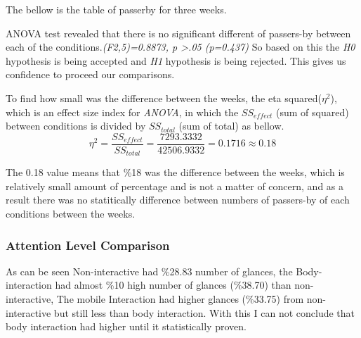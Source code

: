 The bellow is the table of passerby for three weeks.

\begin{table}[H]
\caption{Number of passerby in three weeks}
\label{tab:passerbyofthreeweeks}
\centering
{}
\end{table}

ANOVA test revealed that there is no significant different of passers-by between each of the conditions.\emph{(F2,5)=0.8873, p >.05 (p=0.437)}
So based on this the \emph{H0} hypothesis is being accepted and \emph{H1} hypothesis is being rejected. This gives us confidence to proceed our comparisons.

To find how small was the difference between the weeks, the eta squared(${\eta}^2$), which is an effect size index for \emph{ANOVA}, in which the $SS_{effect}$ (sum of squared) between conditions is divided by $SS_{total}$  (sum of total) as bellow.
\[
{\eta}^2 = \frac{{SS}_{effect}}{{SS}_{total}} = \frac{7293.3332}{42506.9332} = 0.1716\approx 0.18
\]

The 0.18 value means that \%18 was the difference between the weeks, which is relatively small amount of percentage and is not a matter of concern, and as a result there was no statitically difference between numbers of passers-by of each conditions between the weeks.




\subsubsection {Attention Level Comparison}
As can be seen Non-interactive had \%28.83 number of glances, the Body-interaction had almost \%10 high number of glances (\%38.70) than non-interactive, The mobile Interaction had higher glances (\%33.75) from non-interactive but still less than body interaction.  With this I can not conclude that body interaction had higher until it statistically proven.

